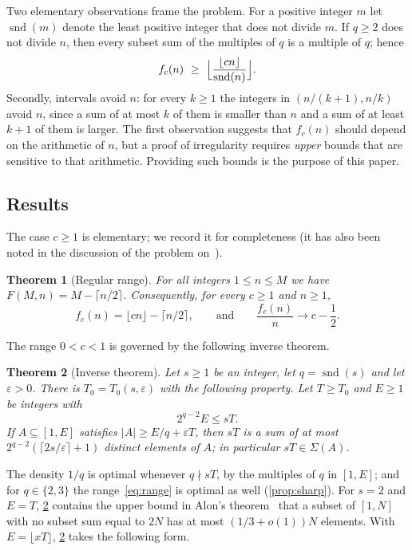 \documentclass[11pt,reqno]{amsart}
\numberwithin{equation}{section}
\newtheorem{theorem}{Theorem}[section]
\theoremstyle{definition}
\theoremstyle{remark}
\newcommand{\eps}{\varepsilon}
\newcommand{\card}[1]{\lvert #1\rvert}
\newcommand{\floor}[1]{\lfloor #1\rfloor}
\newcommand{\ceil}[1]{\lceil #1\rceil}
\newcommand{\snd}{\operatorname{snd}}
\newcommand{\Sig}{\Sigma}
\begin{document}
Two elementary observations frame the problem. For a positive integer $m$ let $\snd(m)$ denote the least positive integer that does not divide $m$. If $q\ge2$ does not divide $n$, then every subset sum of the multiples of $q$ is a multiple of $q$; hence
\begin{equation}\label{eq:trivial-lower}
 f_c(n)\ \ge\ \Bigl\lfloor\frac{\floor{cn}}{\snd(n)}\Bigr\rfloor .
\end{equation}
Secondly, intervals avoid $n$: for every $k\ge1$ the integers in $(n/(k+1),n/k)$ avoid $n$, since a sum of at most $k$ of them is smaller than $n$ and a sum of at least $k+1$ of them is larger. The first observation suggests that $f_c(n)$ should depend on the arithmetic of $n$, but a proof of irregularity requires \emph{upper} bounds that are sensitive to that arithmetic. Providing such bounds is the purpose of this paper.

\subsection{Results}
The case $c\ge1$ is elementary; we record it for completeness (it has also been noted in the discussion of the problem on~\cite{Bl}).

\begin{theorem}[Regular range]\label{thm:cge1}
For all integers $1\le n\le M$ we have $F(M,n)=M-\ceil{n/2}$. Consequently, for every $c\ge1$ and $n\ge1$,
\[
 f_c(n)=\floor{cn}-\ceil{n/2},\qquad\text{and}\qquad \frac{f_c(n)}{n}\longrightarrow c-\frac12 .
\]
\end{theorem}

The range $0<c<1$ is governed by the following inverse theorem.

\begin{theorem}[Inverse theorem]\label{thm:inverse}
Let $s\ge1$ be an integer, let $q=\snd(s)$ and let $\eps>0$. There is $T_0=T_0(s,\eps)$ with the following property. Let $T\ge T_0$ and $E\ge1$ be integers with
\begin{equation}\label{eq:range}
 2^{q-2}E\le sT .
\end{equation}
If $A\subseteq[1,E]$ satisfies $\card A\ge E/q+\eps T$, then $sT$ is a sum of at most $2^{q-2}(\ceil{2s/\eps}+1)$ distinct elements of $A$; in particular $sT\in\Sig(A)$.
\end{theorem}

The density $1/q$ is optimal whenever $q\nmid sT$, by the multiples of $q$ in $[1,E]$; and for $q\in\{2,3\}$ the range~\eqref{eq:range} is optimal as well (\cref{prop:sharp}). For $s=2$ and $E=T$, \cref{thm:inverse} contains the upper bound in Alon's theorem~\cite[Corollary~2.6]{Al87} that a subset of $[1,N]$ with no subset sum equal to $2N$ has at most $(1/3+o(1))N$ elements. With $E=\floor{xT}$, \cref{thm:inverse} takes the following form.
\end{document}
